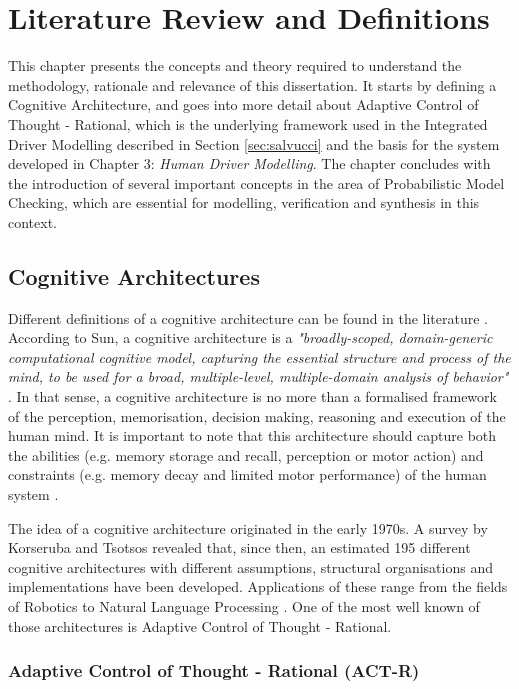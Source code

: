 \chapter{Literature Review and Definitions}
\label{sec:background}

This chapter presents the concepts and theory required to understand the methodology, rationale and relevance of this dissertation. It starts by defining a Cognitive Architecture, and goes into more detail about Adaptive Control of Thought - Rational, which is the underlying framework used in the Integrated Driver Modelling described in Section \ref{sec:salvucci} and the basis for the system developed in Chapter 3: \textit{Human Driver Modelling}. The chapter concludes with the introduction of several important concepts in the area of Probabilistic Model Checking, which are essential for modelling, verification and synthesis in this context.

\section{Cognitive Architectures}

Different definitions of a cognitive architecture can be found in the literature \cite{cog_arch_1}. According to Sun, a cognitive architecture is a \textit{"broadly-scoped, domain-generic computational cognitive model, capturing the essential structure and process of the mind, to be used for a broad, multiple-level, multiple-domain analysis of behavior"} \cite{cog_arch_2}. In that sense, a cognitive architecture is no more than a formalised framework of the perception, memorisation, decision making, reasoning and execution of the human mind. It is important to note that this architecture should capture both the abilities (e.g. memory storage and recall, perception or motor action) and constraints (e.g. memory decay and limited motor performance) of the human system \cite{salvucci_1}.

The idea of a cognitive architecture originated in the early 1970s. A survey by Korseruba and Tsotsos  \cite{cog_arch_1} revealed that, since then, an estimated 195 different cognitive architectures with different assumptions, structural organisations and implementations have been developed. Applications of these range from the fields of Robotics to Natural Language Processing \cite{cog_arch_1}. One of the most well known of those architectures is Adaptive Control of Thought - Rational.

\subsection{Adaptive Control of Thought - Rational (ACT-R)}

